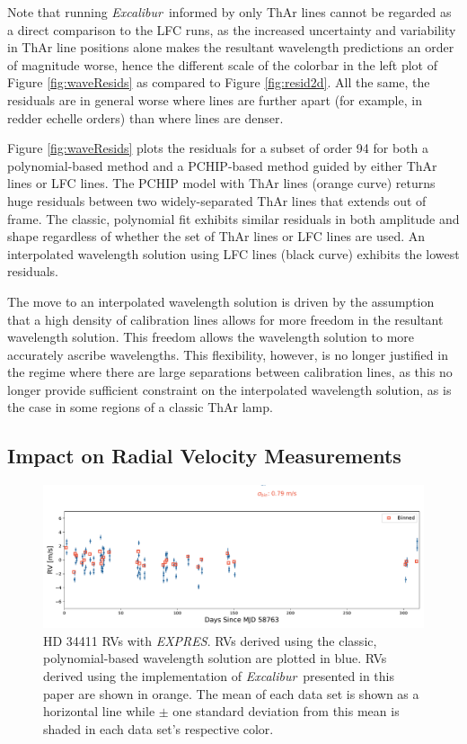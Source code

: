 \documentclass[modern]{aastex63}
\newcommand{\project}[1]{\textsl{#1}}
\newcommand{\name}{\project{Excalibur}}
\newcommand{\acronym}[1]{{\small{#1}}}
\newcommand{\expres}{\project{\acronym{EXPRES}}}
\begin{document}
Note that running \name\ informed by only ThAr lines cannot be regarded as a direct comparison to the LFC runs, as the increased uncertainty and variability in ThAr line positions alone makes the resultant wavelength predictions an order of magnitude worse, hence the different scale of the colorbar in the left plot of Figure \ref{fig:waveResids} as compared to Figure \ref{fig:resid2d}.  All the same, the residuals are in general worse where lines are further apart (for example, in redder echelle orders) than where lines are denser.

Figure \ref{fig:waveResids} plots the residuals for a subset of order 94 for both a polynomial-based method and a PCHIP-based method guided by either ThAr lines or LFC lines.   The PCHIP model with ThAr lines (orange curve) returns huge residuals between two widely-separated ThAr lines that extends out of frame.  The classic, polynomial fit exhibits similar residuals in both amplitude and shape regardless of whether the set of ThAr lines or LFC lines are used.  An interpolated wavelength solution using LFC lines (black curve) exhibits the lowest residuals.

The move to an interpolated wavelength solution is driven by the assumption that a high density of calibration lines allows for more freedom in the resultant wavelength solution.  This freedom allows the wavelength solution to more accurately ascribe wavelengths.  This flexibility, however, is no longer justified in the regime where there are large separations between calibration lines, as this no longer provide sufficient constraint on the interpolated wavelength solution, as is the case in some regions of a classic ThAr lamp.

\subsection{Impact on Radial Velocity Measurements}\label{sec:test-rv}

\begin{figure}[t]
\centering
\includegraphics[width=\textwidth]{Figures/rvs.pdf}
\caption{HD 34411 RVs with \expres.  RVs derived using the classic, polynomial-based wavelength solution are plotted in blue.  RVs derived using the implementation of \name\ presented in this paper are shown in orange.  The mean of each data set is shown as a horizontal line while $\pm$ one standard deviation from this mean is shaded in each data set's respective color.}
\label{fig:rvs}
\end{figure}
\end{document}
